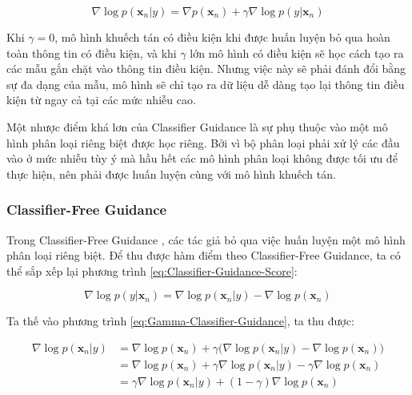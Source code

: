 \documentclass[14pt, a4paper]{article}
\numberwithin{equation}{section}
\numberwithin{figure}{section}
\numberwithin{dl}{section}
\numberwithin{md}{section}
\numberwithin{bd}{section}
\numberwithin{dn}{section}
\numberwithin{hq}{section}
\begin{document}
    \begin{equation} \label{eq:Gamma-Classifier-Guidance}
        \nabla \log p(\boldsymbol{x}_n \vert y) = \nabla p(\boldsymbol{x}_n) + \gamma \nabla \log p (y \vert \boldsymbol{x}_n)
    \end{equation}

    Khi $\gamma=0$, mô hình khuếch tán có điều kiện khi được huấn luyện bỏ qua hoàn toàn thông tin có điều kiện, và khi $\gamma$ lớn mô hình có điều kiện sẽ học cách tạo ra các mẫu gắn chặt vào thông tin điều kiện.
    Nhưng việc này sẽ phải đánh đổi bằng sự đa dạng của mẫu, mô hình sẽ chỉ tạo ra dữ liệu dễ dàng tạo lại thông tin điều kiện từ ngay cả tại các mức nhiễu cao.

    Một nhược điểm khá lơn của Classifier Guidance là sự phụ thuộc vào một mô hình phân loại riêng biệt được học riêng.
    Bởi vì bộ phân loại phải xử lý các đầu vào ở mức nhiễu tùy ý mà hầu hết các mô hình phân loại không được tối ưu để thực hiện, nên phải được huấn luyện cùng với mô hình khuếch tán.

    \subsubsection{Classifier-Free Guidance}

    Trong Classifier-Free Guidance \cite{ho2021classifier}, các tác giả bỏ qua việc huấn luyện một mô hình phân loại riêng biệt.
    Để thu được hàm điểm theo Classifier-Free Guidance, ta có thể sắp xếp lại phương trình \ref{eq:Classifier-Guidance-Score}:

    \begin{equation}
        \nabla \log p(y \vert \boldsymbol{x}_n) = \nabla \log p (\boldsymbol{x}_n \vert y) - \nabla \log p(\boldsymbol{x}_n)
    \end{equation}

    Ta thế vào phương trình \ref{eq:Gamma-Classifier-Guidance}, ta thu được:

    \begin{equation}
        \begin{aligned}
            \nabla \log p(\boldsymbol{x}_n \vert y) &= \nabla \log p(\boldsymbol{x}_n) + \gamma \big( \nabla \log p(\boldsymbol{x}_n \vert y) - \nabla \log p(\boldsymbol{x}_n) \big) \\
            &= \nabla \log p(\boldsymbol{x}_n) + \gamma \nabla \log p(\boldsymbol{x}_n \vert y) - \gamma \nabla \log p(\boldsymbol{x}_n) \\
            &= \gamma \nabla \log p(\boldsymbol{x}_n \vert y) + (1 - \gamma) \nabla \log p(\boldsymbol{x}_n)
        \end{aligned}
    \end{equation}
\end{document}
